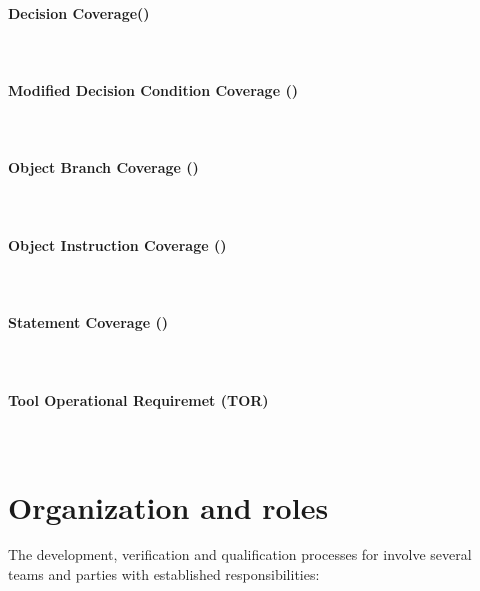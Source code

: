 \paragraph*{Decision Coverage(\dc)} \ \\

\paragraph*{Modified Decision Condition Coverage (\mcdc)} \ \\

\paragraph*{Object Branch Coverage (\obc)} \ \\

\paragraph*{Object Instruction Coverage (\oic)} \ \\

\paragraph*{Statement Coverage (\stc)} \ \\

\paragraph*{Tool Operational Requiremet (TOR)} \ \\

\section{Organization and roles}

The development, verification and qualification processes for \xcov{} involve
several teams and parties with established responsibilities:

